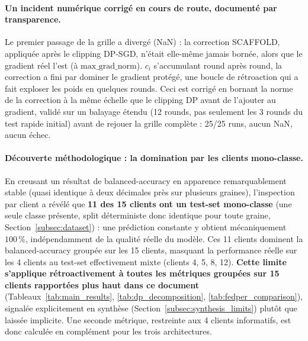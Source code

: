 \documentclass{article}
\begin{document}
\paragraph{Un incident numérique corrigé en cours de route, documenté par transparence.}
Le premier passage de la grille a divergé (NaN) : la correction SCAFFOLD, appliquée
après le clipping DP-SGD, n'était elle-même jamais bornée, alors que le gradient réel
l'est (à $\text{max\_grad\_norm}$). $c_i$ s'accumulant round après round, la correction
a fini par dominer le gradient protégé, une boucle de rétroaction qui a fait exploser
les poids en quelques rounds. Ceci est corrigé en bornant la norme de la correction à
la même échelle que le clipping DP avant de l'ajouter au gradient, validé sur un
balayage étendu (12 rounds, pas seulement les 3 rounds du test rapide initial) avant de
rejouer la grille complète : 25/25 runs, aucun NaN, aucun échec.

\paragraph{Découverte méthodologique : la domination par les clients mono-classe.} En
creusant un résultat de balanced-accuracy en apparence remarquablement stable
(quasi identique à deux décimales près sur plusieurs graines), l'inspection par client a
révélé que \textbf{11 des 15 clients ont un test-set mono-classe} (une seule classe
présente, split déterministe donc identique pour toute graine, Section~\ref{subsec:dataset}) :
une prédiction constante y obtient mécaniquement $100\,\%$, indépendamment de la qualité
réelle du modèle. Ces 11 clients dominent la balanced-accuracy groupée sur les 15
clients, masquant la performance réelle sur les 4 clients au test-set effectivement mixte
(clients 4, 5, 8, 12). \textbf{Cette limite s'applique rétroactivement à toutes les
métriques groupées sur 15 clients rapportées plus haut dans ce document}
(Tableaux~\ref{tab:main_results}, \ref{tab:dp_decomposition}, \ref{tab:fedper_comparison}),
signalée explicitement en synthèse (Section~\ref{subsec:synthesis_limits}) plutôt que
laissée implicite. Une seconde métrique, restreinte aux 4 clients informatifs, est donc
calculée en complément pour les trois architectures.
\end{document}
